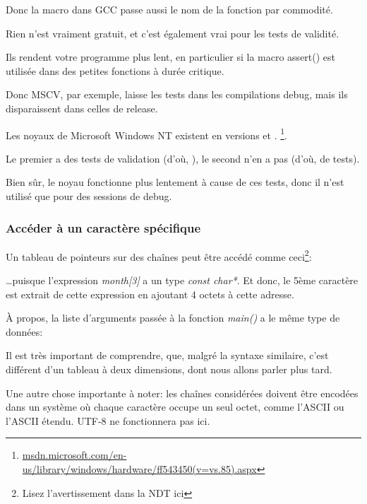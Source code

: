 

Donc la macro dans GCC passe aussi le nom de la fonction par commodité.

Rien n'est vraiment gratuit, et c'est également vrai pour les tests de validité.

Ils rendent votre programme plus lent, en particulier si la macro assert() est utilisée
dans des petites fonctions à durée critique.

Donc MSCV, par exemple, laisse les tests dans les compilations debug, mais ils disparaissent
dans celles de release.

Les noyaux de Microsoft \gls{Windows NT} existent en versions  et .
\footnote{\href{http://go.yurichev.com/17259}{msdn.microsoft.com/en-us/library/windows/hardware/ff543450(v=vs.85).aspx}}.

Le premier a des tests de validation (d'où, ), le second n'en a pas (d'où,  de tests).

Bien sûr, le noyau  fonctionne plus lentement à cause de ces tests, donc
il n'est utilisé que pour des sessions de debug.


\subsubsection{Accéder à un caractère spécifique}

Un tableau de pointeurs sur des chaînes peut être accédé comme ceci\footnote{Lisez
l'avertissement dans la NDT ici }:



\dots puisque l'expression \emph{month[3]} a un type \emph{const char*}.
Et donc, le 5ème caractère est extrait de cette expression en ajoutant 4 octets à
cette adresse.

À propos, la liste d'arguments passée à la fonction \emph{main()} a le même type de
données:



Il est très important de comprendre, que, malgré la syntaxe similaire, c'est différent
d'un tableau à deux dimensions, dont nous allons parler plus tard.

Une autre chose importante à noter: les chaînes considérées doivent être encodées
dans un système où chaque caractère occupe un seul octet, comme l'\ac{ASCII} ou l'\ac{ASCII}
étendu.
UTF-8 ne fonctionnera pas ici.

